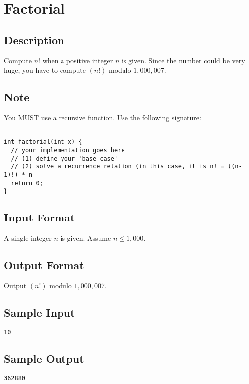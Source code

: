 

\begin{center}\end{center}
\vspace{5mm}


\section{Factorial}

\subsection*{Description}
Compute $n!$ when a positive integer $n$ is given.  Since the number could be very huge, you have to compute $(n!)$ modulo $1,000,007$. 

\subsection*{Note}
You MUST use a recursive function. Use the following signature:
\begin{verbatim}

int factorial(int x) {
  // your implementation goes here
  // (1) define your 'base case'
  // (2) solve a recurrence relation (in this case, it is n! = ((n-1)!) * n
  return 0;
}
\end{verbatim}

\subsection*{Input Format}
A single integer $n$ is given. Assume $n \leq 1,000$.

\subsection*{Output Format}
Output $(n!)$ modulo $1,000,007$. 

\subsection*{Sample Input}
\begin{verbatim}
10
\end{verbatim}

\subsection*{Sample Output}
\begin{verbatim}
362880
\end{verbatim}

